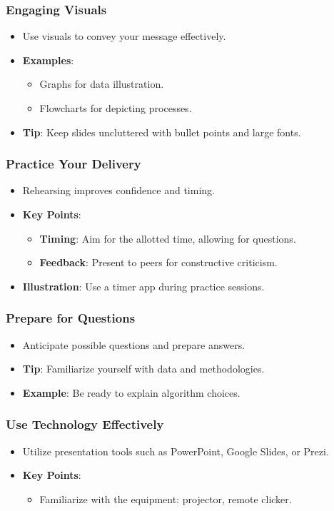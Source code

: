 \documentclass[aspectratio=169]{beamer}
\begin{document}
\begin{frame}[fragile]
    \frametitle{Engaging Visuals}
    \begin{itemize}
        \item Use visuals to convey your message effectively.
        \item \textbf{Examples}:
            \begin{itemize}
                \item Graphs for data illustration.
                \item Flowcharts for depicting processes.
            \end{itemize}
        \item \textbf{Tip}: Keep slides uncluttered with bullet points and large fonts.
    \end{itemize}
\end{frame}

\begin{frame}[fragile]
    \frametitle{Practice Your Delivery}
    \begin{itemize}
        \item Rehearsing improves confidence and timing.
        \item \textbf{Key Points}:
            \begin{itemize}
                \item \textbf{Timing}: Aim for the allotted time, allowing for questions.
                \item \textbf{Feedback}: Present to peers for constructive criticism.
            \end{itemize}
        \item \textbf{Illustration}: Use a timer app during practice sessions.
    \end{itemize}
\end{frame}

\begin{frame}[fragile]
    \frametitle{Prepare for Questions}
    \begin{itemize}
        \item Anticipate possible questions and prepare answers.
        \item \textbf{Tip}: Familiarize yourself with data and methodologies.
        \item \textbf{Example}: Be ready to explain algorithm choices.
    \end{itemize}
\end{frame}

\begin{frame}[fragile]
    \frametitle{Use Technology Effectively}
    \begin{itemize}
        \item Utilize presentation tools such as PowerPoint, Google Slides, or Prezi.
        \item \textbf{Key Points}:
            \begin{itemize}
                \item Familiarize with the equipment: projector, remote clicker.
            \end{itemize}
    \end{itemize}
\end{frame}
\end{document}
